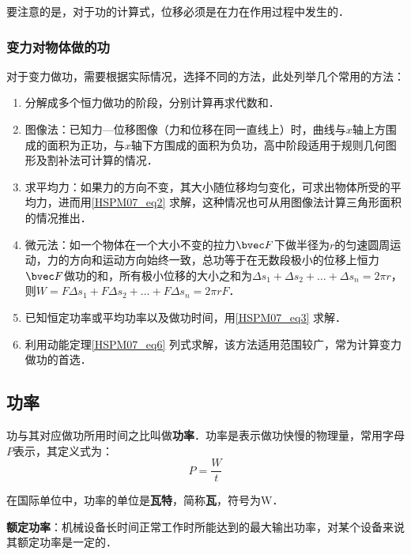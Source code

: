 要注意的是，对于功的计算式，位移必须是在力在作用过程中发生的．

\subsubsection{变力对物体做的功}

对于变力做功，需要根据实际情况，选择不同的方法，此处列举几个常用的方法：

\begin{enumerate}
\item 分解成多个恒力做功的阶段，分别计算再求代数和．

\item 图像法：已知力—位移图像（力和位移在同一直线上）时，曲线与$x$轴上方围成的面积为正功，与$x$轴下方围成的面积为负功，高中阶段适用于规则几何图形及割补法可计算的情况．

\item 求平均力：如果力的方向不变，其大小随位移均匀变化，可求出物体所受的平均力，进而用\autoref{HSPM07_eq2} 求解，这种情况也可从用图像法计算三角形面积的情况推出．

\item 微元法：如一个物体在一个大小不变的拉力$\bvec F$下做半径为$r$的匀速圆周运动，力的方向和运动方向始终一致，总功等于在无数段极小的位移上恒力$\bvec F$做功的和，所有极小位移的大小之和为$\Delta s_1+\Delta s_2+\dots+\Delta s_n=2\pi r$，则$W=F\Delta s_1+F\Delta s_2+\dots+F\Delta s_n=2\pi rF$．

\item 已知恒定功率或平均功率以及做功时间，用\autoref{HSPM07_eq3} 求解．

\item 利用动能定理\autoref{HSPM07_eq6} 列式求解，该方法适用范围较广，常为计算变力做功的首选．
\end{enumerate}

\subsection{功率}

功与其对应做功所用时间之比叫做\textbf{功率}．功率是表示做功快慢的物理量，常用字母$P$表示，其定义式为：
\begin{equation}\label{HSPM07_eq3}
P=\frac{W}{t}
\end{equation}

在国际单位中，功率的单位是\textbf{瓦特}，简称\textbf{瓦}，符号为$\mathrm{W}$．

\textbf{额定功率}：机械设备长时间正常工作时所能达到的最大输出功率，对某个设备来说其额定功率是一定的．

